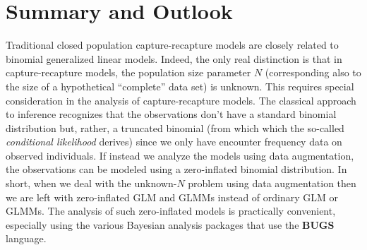 \section{Summary and Outlook}

Traditional closed population capture-recapture models are closely
related to binomial generalized linear models.  Indeed, the only real
distinction is that in capture-recapture models, the population size
parameter $N$ (corresponding also to the size of a hypothetical
``complete'' data set) is unknown.  This requires special
consideration in the analysis of capture-recapture models. The
classical approach to inference recognizes that the observations don't
have a standard binomial distribution but, rather, a truncated
binomial (from which which the so-called {\it conditional likelihood}
derives) since we only have encounter frequency data on observed
individuals. If instead we analyze the models using data augmentation,
the observations can be modeled using a zero-inflated binomial
distribution. In short, when we deal with the unknown-$N$ problem using
data augmentation then we are left with zero-inflated GLM and GLMMs
instead of ordinary GLM or GLMMs. The analysis of such zero-inflated
models is practically convenient, especially using the various
Bayesian analysis packages that use the {\bf BUGS} language.

